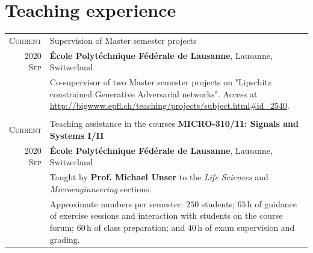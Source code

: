 \documentclass[a4paper,10pt]{article}
\begin{document}

  \vspace{15pt}

  \section{Teaching experience}

    \begin{tabular}{r|p{13cm}}

      \textsc{Current}	 & Supervision of Master semester projects \\
      \textsc{2020 Sep}  & \footnotesize{\textbf{École Polytéchnique Fédérale de Lausanne}, Lausanne, Switzerland} \\
      & \footnotesize{Co-supervisor of two Master semester projects on "Lipschitz constrained Generative Adversarial networks". Access at \url{http://bigwww.epfl.ch/teaching/projects/subject.html#id_2540}.} \\
      \multicolumn{2}{c}{} \\

	  \textsc{Current}     & Teaching assistance in the courses \textbf{MICRO-310/11: Signals and Systems I/II} \\
	  \textsc{2020 Sep} & \footnotesize{\textbf{École Polytéchnique Fédérale de Lausanne}, Lausanne, Switzerland} \\
    & \footnotesize{Taught by \textbf{Prof. Michael Unser} to the \emph{Life Sciences} and \emph{Microenginneering} sections.} \\
    & \footnotesize{Approximate numbers per semester:
              $250$ students;
              $65\,\mathrm{h}$ of guidance of exercise sessions and interaction with students on the course forum;
              $60\,\mathrm{h}$ of class preparation; and
							$40\,\mathrm{h}$ of exam supervision and grading.
              } \\

    \end{tabular}


\end{document}
